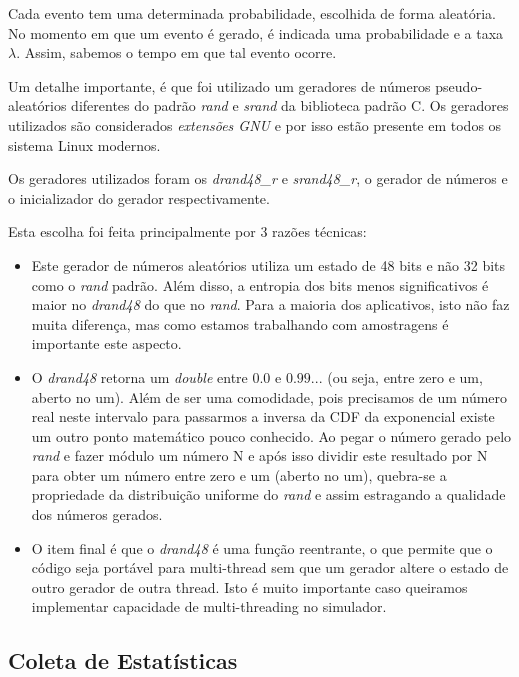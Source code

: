 \documentclass[a4paper,10pt]{article}
\begin{document}
	Cada evento tem uma determinada probabilidade, escolhida de forma aleatória. No momento em que um evento é gerado, é indicada uma probabilidade e a taxa $\lambda$. Assim, sabemos o tempo em que tal evento ocorre.

	Um detalhe importante, é que foi utilizado um geradores de números pseudo-aleatórios diferentes do padrão \emph{rand} e \emph{srand} da biblioteca padrão C. Os geradores utilizados são considerados \emph{extensões GNU} e por isso estão presente em todos os sistema Linux modernos.

	Os geradores utilizados foram os \emph{drand48\_r\(\)} e \emph{srand48\_r\(\)}, o gerador de números e o inicializador do gerador respectivamente.

	Esta escolha foi feita principalmente por 3 razões técnicas:
	\begin{itemize}
	\item Este gerador de números aleatórios utiliza um estado de 48 bits e não 32 bits como o \emph{rand} padrão. Além disso, a entropia dos bits menos significativos é maior no \emph{drand48} do que no \emph{rand}. Para a maioria dos aplicativos, isto não faz muita diferença, mas como estamos trabalhando com amostragens é importante este aspecto.

	\item O \emph{drand48} retorna um \emph{double} entre $0.0$ e $0.99...$ (ou seja, entre zero e um, aberto no um). Além de ser uma comodidade, pois precisamos de um número real neste intervalo para passarmos a inversa da CDF da exponencial existe um outro ponto matemático pouco conhecido. Ao pegar o número gerado pelo \emph{rand} e fazer módulo um número N e após isso dividir este resultado por N para obter um número entre zero e um (aberto no um), quebra-se a propriedade da distribuição uniforme do \emph{rand} e assim estragando a qualidade dos números gerados.

	\item O item final é que o \emph{drand48} é uma função reentrante, o que permite que o código seja portável para multi-thread sem que um gerador altere o estado de outro gerador de outra thread. Isto é muito importante caso queiramos implementar capacidade de multi-threading no simulador.
	\end{itemize}

\subsection{Coleta de Estatísticas}
\end{document}
